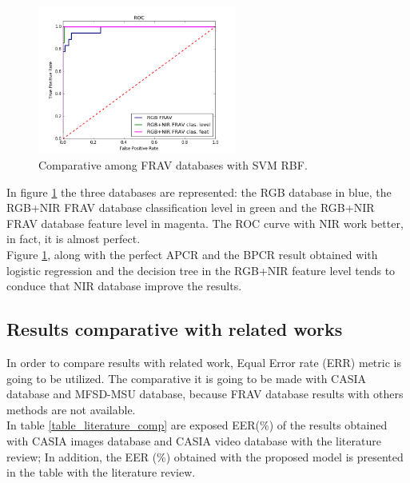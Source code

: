 \begin{figure}[htb]
\centering
\includegraphics[width=0.58\textwidth]{images/comparative/FRAVs_SVM_RBF_ROC.png}
\caption{Comparative among FRAV databases with SVM RBF.} \label{fig:FRAVS_SVM_comparative}
\end{figure}

In figure \ref{fig:FRAVS_SVM_comparative} the three databases are represented: the RGB database in blue, the RGB+NIR FRAV database classification level in green and the RGB+NIR FRAV database  feature level in magenta. The ROC curve with NIR work better, in fact, it is almost perfect.\\

Figure \ref{fig:FRAVS_SVM_comparative}, along with the perfect APCR and the BPCR result obtained with logistic regression and the decision tree in the RGB+NIR feature level tends to conduce that NIR database improve the results.\\

\subsection{Results comparative with related works}\label{sec:comp_results_literature}
In order to compare results with related work, Equal Error rate (ERR) metric is going to be utilized. The comparative it is going to be made with CASIA database and MFSD-MSU database, because FRAV database results with others methods are not available.\\

In table \ref{table_literature_comp} are exposed EER(\%) of the results obtained with CASIA images database and CASIA video database with the literature review; In addition, the EER (\%) obtained with the proposed model is presented in the table with the literature review.\\


